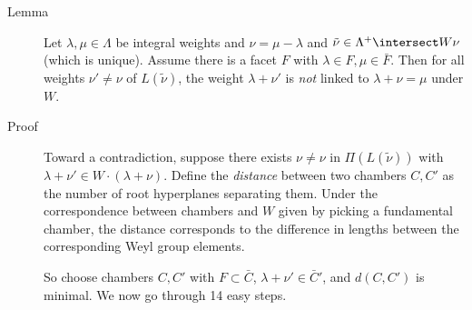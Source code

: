 \begin{description}
\item[Lemma]
Let \(\lambda, \mu \in \Lambda\) be integral weights and
\(\nu = \mu - \lambda\) and
\(\tilde \nu \in \Lambda^+ \intersect W \nu\) (which is unique). Assume
there is a facet \(F\) with \(\lambda \in F, \mu \in \bar F\). Then for
all weights \(\nu' \neq \nu\) of \(L(\tilde\nu)\), the weight
\(\lambda + \nu'\) is \emph{not} linked to \(\lambda + \nu = \mu\) under
\(W\).
\item[Proof]
\hfill

Toward a contradiction, suppose there exists \(\nu \neq \nu\) in
\(\Pi(L(\tilde \nu))\) with
\(\lambda + \nu' \in W\cdot (\lambda + \nu)\). Define the
\emph{distance} between two chambers \(C, C'\) as the number of root
hyperplanes separating them. Under the correspondence between chambers
and \(W\) given by picking a fundamental chamber, the distance
corresponds to the difference in lengths between the corresponding Weyl
group elements.

\hfill\break

So choose chambers \(C, C'\) with \(F \subset \bar C\),
\(\lambda + \nu' \in \bar C'\), and \(d(C, C')\) is minimal. We now go
through 14 easy steps.

\hfill\break


\end{description}
